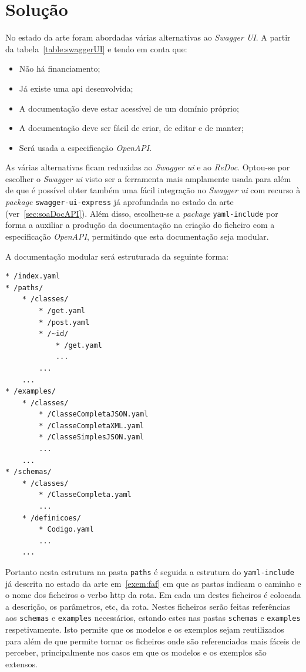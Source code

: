 \section{Solução}

No estado da arte foram abordadas várias alternativas ao \textit{Swagger UI}. 
A partir da tabela~\ref{table:swaggerUI} e tendo em conta que:
\begin{itemize}
    \item Não há financiamento;
    \item Já existe uma \acrshort{api} desenvolvida;
    \item A documentação deve estar acessível de um domínio próprio;
    \item A documentação deve ser fácil de criar, de editar e de manter;
    \item Será usada a especificação \textit{OpenAPI}.
\end{itemize}

As várias alternativas ficam reduzidas ao \textit{Swagger \acrshort{ui}} e ao \textit{ReDoc}. 
Optou-se por escolher o \textit{Swagger \acrshort{ui}} visto ser a ferramenta mais amplamente usada para além de 
que é possível obter também uma fácil integração no \textit{Swagger \acrshort{ui}} com recurso 
à \textit{package} \texttt{swagger-ui-express} já aprofundada no estado da arte (ver~\ref{sec:soaDocAPI}). 
Além disso, escolheu-se a \textit{package} \texttt{yaml-include} por forma a auxiliar a produção da 
documentação na criação do ficheiro com a especificação \textit{OpenAPI}, permitindo que esta documentação 
seja modular.

A documentação modular será estruturada da seguinte forma:

\begin{lstlisting}[caption=Excerto da estrutura modular da documentação]
* /index.yaml
* /paths/
    * /classes/
        * /get.yaml
        * /post.yaml
        * /~id/
            * /get.yaml
            ...
        ...
    ...
* /examples/
    * /classes/
        * /ClasseCompletaJSON.yaml
        * /ClasseCompletaXML.yaml
        * /ClasseSimplesJSON.yaml
        ...
    ...
* /schemas/
    * /classes/
        * /ClasseCompleta.yaml
        ...
    * /definicoes/
        * Codigo.yaml
        ...
    ...
\end{lstlisting}

Portanto nesta estrutura na pasta \texttt{paths} é seguida a estrutura do \texttt{yaml-include} já descrita no 
estado da arte em~\ref{exem:faf} em que as pastas indicam o caminho e o nome dos ficheiros o verbo \acrshort{http} 
da rota. Em cada um destes ficheiros é colocada a descrição, os parâmetros, etc, da rota. 
Nestes ficheiros serão feitas referências aos \texttt{schemas} e \texttt{examples} necessários, estando estes nas 
pastas \texttt{schemas} e \texttt{examples} respetivamente. Isto permite que os modelos e os exemplos sejam 
reutilizados para além de que permite tornar os ficheiros onde são referenciados mais fáceis de perceber, 
principalmente nos casos em que os modelos e os exemplos são extensos.

